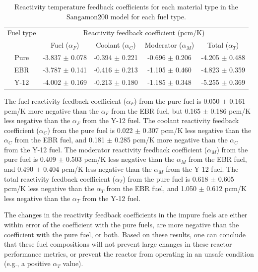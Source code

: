 \begin{table}[h!]
        \centering
        \caption{Reactivity temperature feedback coefficients for 
        each material type in the Sangamon200 model for each fuel 
        type.}
        \label{tab:coeff_xe100}
        \begin{tabular}{c c c c c}
            \hline 
            Fuel type & \multicolumn{4}{c}{Reactivity feedback coefficient (pcm/K)} \\
            & Fuel ($\alpha_F$) & Coolant ($\alpha_C$) & Moderator ($\alpha_M$) & Total ($\alpha_T$)\\
            \hline
            Pure & -3.837 $\pm$ 0.078 & -0.394 $\pm$ 0.221 & -0.696 $\pm$ 0.206 & -4.205 $\pm$ 0.488\\
            \gls*{EBR} & -3.787 $\pm$ 0.141 & -0.416 $\pm$ 0.213 & -1.105 $\pm$ 0.460 & -4.823 $\pm$ 0.359\\
            Y-12 & -4.002 $\pm$ 0.169 & -0.213 $\pm$ 0.180 & -1.185 $\pm$ 0.348 & -5.255 $\pm$ 0.369\\
            \hline

        \end{tabular}
\end{table}

The fuel reactivity feedback coefficient 
($\alpha_F$) from the pure fuel is 0.050 $\pm$ 0.161 pcm/K more negative than the $\alpha_F$ 
from the \gls*{EBR} fuel, but 0.165 $\pm$ 0.186 pcm/K less negative than the 
$\alpha_F$ from the Y-12 fuel. 
The coolant reactivity feedback coefficient ($\alpha_C$) from the pure fuel 
is 0.022 $\pm$ 0.307 pcm/K less negative than the $\alpha_C$ from the 
\gls*{EBR} fuel, and 0.181 $\pm$ 0.285 pcm/K more negative than the 
$\alpha_C$ from the Y-12 fuel. 
The moderator reactivity feedback coefficient ($\alpha_M$) from the pure fuel 
is 0.409 $\pm$ 0.503 pcm/K less negative than the $\alpha_M$ from the 
\gls*{EBR} fuel, and 0.490 $\pm$ 0.404 pcm/K less negative than the 
$\alpha_M$ from the Y-12 fuel. 
The total reactivity feedback coefficient ($\alpha_T$) from the pure fuel 
is 0.618 $\pm$ 0.605 pcm/K less negative than the $\alpha_T$ from the 
\gls*{EBR} fuel, and 1.050 $\pm$ 0.612 pcm/K less negative than the 
$\alpha_T$ from the Y-12 fuel. 

The changes in the reactivity feedback coefficients in the impure fuels 
are either within error of the coefficient with the pure fuels, are 
more negative than the coefficient with the pure fuel, or both. Based on these 
results, one can conclude that these fuel compositions will not prevent 
large changes in these reactor performance metrics, or prevent the reactor 
from operating in an unsafe condition (e.g., a positive $\alpha_T$ value). 

